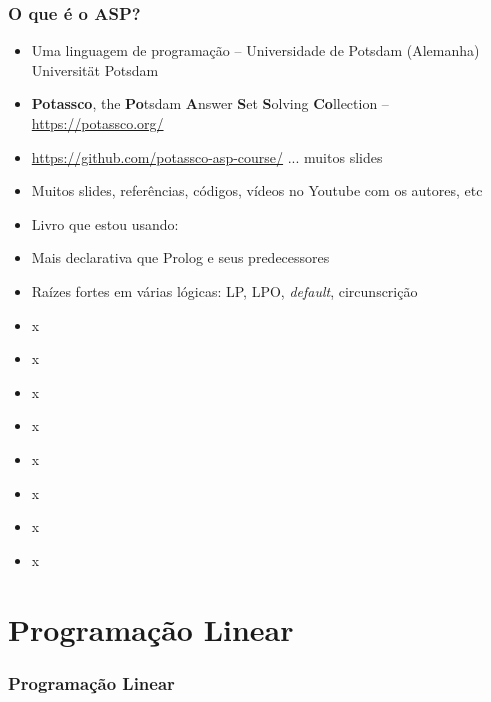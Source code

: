 \documentclass{beamer}
\begin{document}
\begin{frame}[allowframebreaks]

\frametitle{O que é o ASP?}


\begin{block}{}
  \begin{itemize}
   \item Uma linguagem de programação -- Universidade de Potsdam (Alemanha)\\ Universität Potsdam
   
   \item  \textbf{Potassco}, the \textbf{Po}tsdam \textbf{A}nswer \textbf{S}et \textbf{S}olving \textbf{Co}llection -- \url{https://potassco.org/}
   
   \item \url{https://github.com/potassco-asp-course/} ... muitos slides

  \item  Muitos slides, referências, códigos, vídeos no Youtube com os autores, etc
  
  \item Livro que estou usando: 
  
  \item Mais declarativa que Prolog e seus predecessores

  \item Raízes fortes em várias lógicas: LP, LPO, \emph{default}, circunscrição

  \item x
    \item x
      \item x
        \item x
        
  \item x
    \item x
      \item x
        \item x
        

    \end{itemize}
  
\end{block}


\end{frame}






\section{Programação Linear}
\begin{frame}
	\frametitle{Programação Linear}
	
	\begin{figure}[ht!]
		\centering
	\end{figure}
	
\end{frame}
\end{document}
